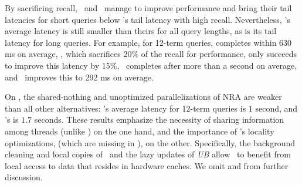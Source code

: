 {{%
By sacrificing recall, \pBMW\ and \pJASS\ manage to improve performance and bring their tail latencies for short queries below \alg's tail latency with high recall. Nevertheless, \alg's average latency is still smaller than theirs for all query lengths, as is its tail latency for long queries.
For example, for 12-term queries, 
\pBMW\hi\/ completes  within $630$ ms on average, 
\pBMW\lo, 
which sacrifices $20\%$ of the recall for performance, only succeeds to improve this latency by $15\%$, 
\pJASS\hi\ completes  after more than a second on average, and \pJASS\lo\ improves this to $292$ ms on average.

On \cw, 
the shared-nothing and unoptimized parallelizations of NRA are weaker than all other alternatives:
\pNRA's  average latency for 12-term queries is $1$ second, and \sNRA's is $1.7$ seconds. 
These results emphasize the necessity of sharing information among threads (unlike \sNRA) on the one hand,
and the importance of \alg's locality optimizations, (which are missing in \pNRA), on the other. 
Specifically, the background cleaning and local copies of \DMap\ and the lazy updates of \emph{UB} allow \alg\ to benefit from 
local access to data that resides in hardware caches. 
We omit \pNRA\/ and \sNRA\/ from further discussion. 

}}
